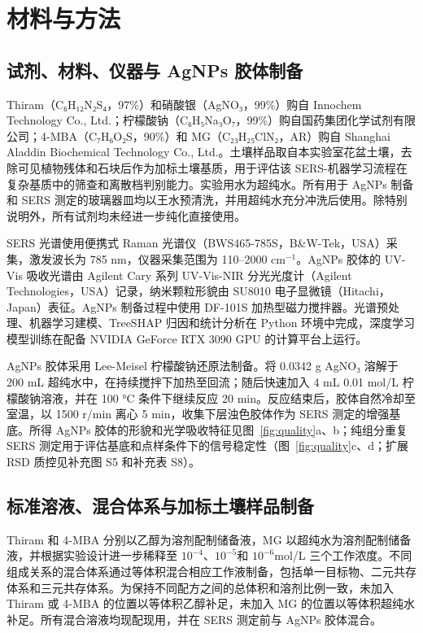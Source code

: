 \documentclass[preprint,12pt]{elsarticle}
\newcommand{\cmone}{cm$^{-1}$}
\newcommand{\molA}{$10^{-4}$}
\newcommand{\molB}{$10^{-5}$}
\newcommand{\molC}{$10^{-6}$}
\begin{document}
\section{材料与方法}

\subsection{试剂、材料、仪器与 AgNPs 胶体制备}

Thiram（C₆H₁₂N₂S₄，97\%）和硝酸银（AgNO₃，99\%）购自 Innochem Technology Co., Ltd.；柠檬酸钠（C₆H₅Na₃O₇，99\%）购自国药集团化学试剂有限公司；4-MBA（C₇H₆O₂S，90\%）和 MG（C₂₃H₂₅ClN₂，AR）购自 Shanghai Aladdin Biochemical Technology Co., Ltd.。土壤样品取自本实验室花盆土壤，去除可见植物残体和石块后作为加标土壤基质，用于评估该 SERS-机器学习流程在复杂基质中的筛查和离散档判别能力。实验用水为超纯水。所有用于 AgNPs 制备和 SERS 测定的玻璃器皿均以王水预清洗，并用超纯水充分冲洗后使用。除特别说明外，所有试剂均未经进一步纯化直接使用。

SERS 光谱使用便携式 Raman 光谱仪（BWS465-785S，B\&W-Tek，USA）采集，激发波长为 785 nm，仪器采集范围为 110–2000 \cmone。AgNPs 胶体的 UV-Vis 吸收光谱由 Agilent Cary 系列 UV-Vis-NIR 分光光度计（Agilent Technologies，USA）记录，纳米颗粒形貌由 SU8010 电子显微镜（Hitachi，Japan）表征。AgNPs 制备过程中使用 DF-101S 加热型磁力搅拌器。光谱预处理、机器学习建模、TreeSHAP 归因和统计分析在 Python 环境中完成，深度学习模型训练在配备 NVIDIA GeForce RTX 3090 GPU 的计算平台上运行。

AgNPs 胶体采用 Lee-Meisel 柠檬酸钠还原法制备\cite{ref11}。将 0.0342 g AgNO₃ 溶解于 200 mL 超纯水中，在持续搅拌下加热至回流；随后快速加入 4 mL 0.01 mol/L 柠檬酸钠溶液，并在 100 °C 条件下继续反应 20 min。反应结束后，胶体自然冷却至室温，以 1500 r/min 离心 5 min，收集下层浊色胶体作为 SERS 测定的增强基底。所得 AgNPs 胶体的形貌和光学吸收特征见图~\ref{fig:quality}a、b；纯组分重复 SERS 测定用于评估基底和点样条件下的信号稳定性（图~\ref{fig:quality}c、d；扩展 RSD 质控见补充图 S5 和补充表 S8）。

\subsection{标准溶液、混合体系与加标土壤样品制备}

Thiram 和 4-MBA 分别以乙醇为溶剂配制储备液，MG 以超纯水为溶剂配制储备液，并根据实验设计进一步稀释至 \molA、\molB 和 \molC mol/L 三个工作浓度。不同组成关系的混合体系通过等体积混合相应工作液制备，包括单一目标物、二元共存体系和三元共存体系。为保持不同配方之间的总体积和溶剂比例一致，未加入 Thiram 或 4-MBA 的位置以等体积乙醇补足，未加入 MG 的位置以等体积超纯水补足。所有混合溶液均现配现用，并在 SERS 测定前与 AgNPs 胶体混合。
\end{document}
